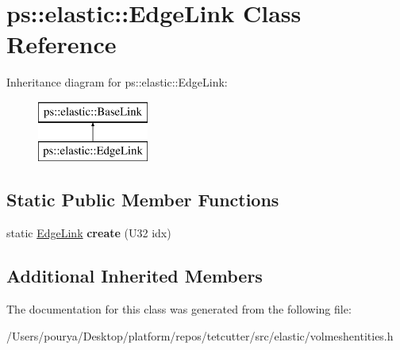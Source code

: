 \hypertarget{classps_1_1elastic_1_1EdgeLink}{}\section{ps\+:\+:elastic\+:\+:Edge\+Link Class Reference}
\label{classps_1_1elastic_1_1EdgeLink}
Inheritance diagram for ps\+:\+:elastic\+:\+:Edge\+Link\+:\begin{figure}[H]
\begin{center}
\leavevmode
\includegraphics[height=2.000000cm]{classps_1_1elastic_1_1EdgeLink}
\end{center}
\end{figure}
\subsection*{Static Public Member Functions}
\begin{DoxyCompactItemize}
\item 
\hypertarget{classps_1_1elastic_1_1EdgeLink_ab58b42b0aa4cfcf6269e549d57f9caf1}{}static \hyperlink{classps_1_1elastic_1_1EdgeLink}{Edge\+Link} {\bfseries create} (U32 idx)\label{classps_1_1elastic_1_1EdgeLink_ab58b42b0aa4cfcf6269e549d57f9caf1}

\end{DoxyCompactItemize}
\subsection*{Additional Inherited Members}


The documentation for this class was generated from the following file\+:\begin{DoxyCompactItemize}
\item 
/\+Users/pourya/\+Desktop/platform/repos/tetcutter/src/elastic/volmeshentities.\+h\end{DoxyCompactItemize}
